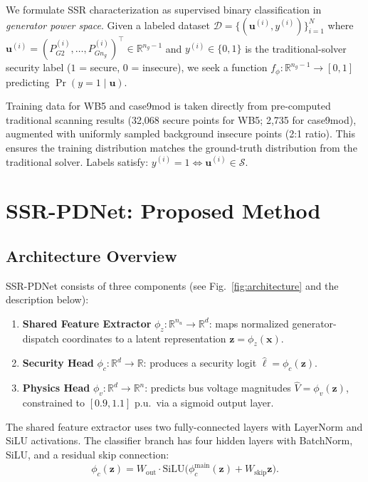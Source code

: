 \documentclass[journal]{IEEEtran}
\newcommand{\R}{\mathbb{R}}
\newcommand{\SSR}{\mathcal{S}}
\newcommand{\bx}{\mathbf{x}}
\newcommand{\bz}{\mathbf{z}}
\begin{document}
We formulate SSR characterization as supervised binary classification in
\emph{generator power space}. Given a labeled dataset
$\mathcal{D} = \{(\mathbf{u}^{(i)}, y^{(i)})\}_{i=1}^{N}$ where
$\mathbf{u}^{(i)} = (P_{G2}^{(i)},\ldots,P_{Gn_g}^{(i)})^\top \in \R^{n_g-1}$
and $y^{(i)} \in \{0, 1\}$ is the traditional-solver security label
($1$ = secure, $0$ = insecure), we seek a function
$f_\phi : \R^{n_g-1} \to [0,1]$ predicting $\Pr(y=1 \mid \mathbf{u})$.

Training data for WB5 and case9mod is taken directly from pre-computed traditional
scanning results (32,068 secure points for WB5; 2,735 for case9mod), augmented
with uniformly sampled background insecure points (2:1 ratio). This ensures
the training distribution matches the ground-truth distribution from the
traditional solver. Labels satisfy: $y^{(i)} = 1 \iff \mathbf{u}^{(i)} \in \SSR$.

\section{SSR-PDNet: Proposed Method}
\label{sec:method}

\subsection{Architecture Overview}

SSR-PDNet consists of three components (see Fig.~\ref{fig:architecture} and the description below):

\begin{enumerate}
  \item \textbf{Shared Feature Extractor} $\phi_z : \R^{n_u} \to \R^d$:
    maps normalized generator-dispatch coordinates to a latent representation
    $\bz = \phi_z(\bx)$.
  \item \textbf{Security Head} $\phi_c : \R^d \to \R$: produces a security
    logit $\hat{\ell} = \phi_c(\bz)$.
  \item \textbf{Physics Head} $\phi_v : \R^d \to \R^n$: predicts bus voltage
    magnitudes $\hat{V} = \phi_v(\bz)$, constrained to $[0.9, 1.1]$ p.u.\ via
    a sigmoid output layer.
\end{enumerate}

The shared feature extractor uses two fully-connected layers with LayerNorm and
SiLU activations. The classifier branch has four hidden layers with
BatchNorm, SiLU, and a residual skip connection:
\begin{equation}
  \phi_c(\bz) = W_{\mathrm{out}} \cdot \mathrm{SiLU}\bigl(
    \phi_c^{\mathrm{main}}(\bz) + W_{\mathrm{skip}} \bz \bigr).
  \label{eq:cls_head}
\end{equation}
\end{document}
